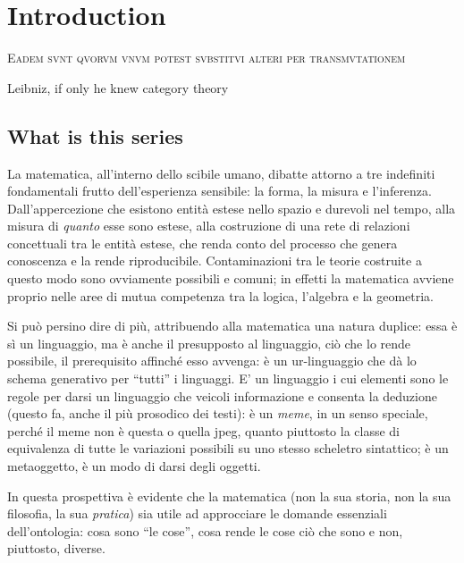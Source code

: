 \section{Introduction}
\epigraph{\textsc{Eadem svnt qvorvm vnvm potest svbstitvi alteri per transmvtationem}}{Leibniz, if only he knew category theory}
\subsection{What is this series}
\color{blue!40}
La matematica, all'interno dello scibile umano, dibatte attorno a tre indefiniti fondamentali frutto dell'esperienza sensibile: la forma, la misura e l'inferenza. Dall'appercezione che esistono entità estese nello spazio e durevoli nel tempo, alla misura di \emph{quanto} esse sono estese, alla costruzione di una rete di relazioni concettuali tra le entità estese, che renda conto del processo che genera conoscenza e la rende riproducibile. Contaminazioni tra le teorie costruite a questo modo sono ovviamente possibili e comuni; in effetti la matematica avviene proprio nelle aree di mutua competenza tra la logica, l'algebra e la geometria. 

Si può persino dire di più, attribuendo alla matematica una natura duplice: essa è sì un linguaggio, ma è anche il presupposto al linguaggio, ciò che lo rende possibile, il prerequisito affinché esso avvenga: è un ur-linguaggio che dà lo schema generativo per ``tutti'' i linguaggi. E' un linguaggio i cui elementi sono le regole per darsi un linguaggio che veicoli informazione e consenta la deduzione (questo fa, anche il più prosodico dei testi): è un \emph{meme}, in un senso speciale, perché il meme non è questa o quella jpeg, quanto piuttosto la classe di equivalenza di tutte le variazioni possibili su uno stesso scheletro sintattico; è un metaoggetto, è un modo di darsi degli oggetti.

In questa prospettiva è evidente che la matematica (non la sua storia, non la sua filosofia, la sua \emph{pratica}) sia utile ad approcciare le domande essenziali dell'ontologia: cosa sono ``le cose'', cosa rende le cose ciò che sono e non, piuttosto, diverse.

